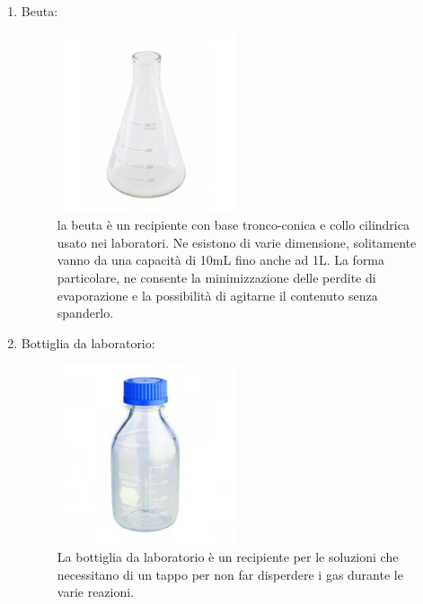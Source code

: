 \documentclass{article}
\begin{document}
\begin{enumerate}
\begin{figure}[H]
		\end{figure}

		\vspace{0.5cm}


		\item Beuta:

		\begin{figure}[H]

			\includegraphics[width=0.5\textwidth]{./immagini/beuta.jpg}
			\caption{la beuta è un recipiente con base tronco-conica e collo cilindrica usato nei laboratori.
			Ne esistono di varie dimensione, solitamente vanno da una capacità di 10mL fino anche ad 1L.
			La forma particolare, ne consente la minimizzazione delle perdite di evaporazione e la possibilità
			di agitarne il contenuto senza spanderlo.}
			\label{beuta}

		\end{figure}

		\vspace{0.5cm}


		\item Bottiglia da laboratorio:

		\begin{figure}[H]

			\includegraphics[width=0.5\textwidth]{./immagini/bottiglia.JPG}
			\caption{La bottiglia da laboratorio è un recipiente per le soluzioni che necessitano di un tappo per non far disperdere i gas durante le varie reazioni.}
			\label{bottiglia}


\end{figure}
\end{enumerate}
\end{document}
